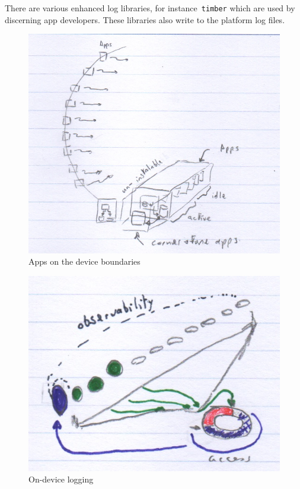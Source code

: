 There are various enhanced log libraries, for instance~\texttt{timber} which are used by discerning app developers. These libraries also write to the platform log files. 

\begin{figure}
    \includegraphics[width=\linewidth]{images/rough-sketches/apps-on-device-boundaries-sketch.jpeg}
    \caption{Apps on the device boundaries}
    \label{fig:apps-on-device-boundaries}
\end{figure}

\begin{figure}
    \includegraphics[width=\linewidth]{images/rough-sketches/on-device-logging-sketch.jpeg}
    \caption{On-device logging}
    \label{fig:on-device-logging}
\end{figure}

